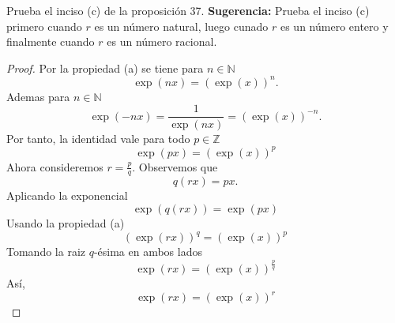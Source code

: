 \documentclass[12pt,a4paper]{article}
\begin{document}
    \begin{mdframed}[style=mdbluebox,frametitle={Ejercicio 4}]
        Prueba el inciso (c) de la proposición 37. \textbf{Sugerencia:} Prueba el
        inciso (c) primero cuando $r$ es un número natural, luego cunado $r$ es un número
        entero y finalmente cuando $r$ es un número racional.
    \end{mdframed}

    \begin{proof}
        Por la propiedad (a) se tiene para $n\in\mathbb{N}$
        \begin{equation*}
            \exp(nx)=(\exp(x))^{n}.
        \end{equation*}
        Ademas para $n\in\mathbb{N}$
        \begin{equation*}
            \exp(-nx)=\frac{1}{\exp(nx)}=(\exp(x))^{-n}.
        \end{equation*}
        Por tanto, la identidad vale para todo $p\in\mathbb{Z}$
        \begin{equation*}
            \exp(px)=(\exp(x))^{p}
        \end{equation*}
        Ahora consideremos $r=\frac{p}{q}$. Observemos que
        \begin{equation*}
            q(rx)=px.
        \end{equation*}
        Aplicando la exponencial
        \begin{equation*}
            \exp(q(rx))=\exp(px)
        \end{equation*}
        Usando la propiedad (a)
        \begin{equation*}
            (\exp(rx))^{q}=(\exp(x))^{p}
        \end{equation*}
        Tomando la raiz $q$-ésima en ambos lados
        \begin{equation*}
            \exp(rx)=(\exp(x))^{\frac{p}{q}}
        \end{equation*}
        Así,
        \begin{equation*}
            \exp(rx)=(\exp(x))^{r}
        \end{equation*}
    \end{proof}
\end{document}
